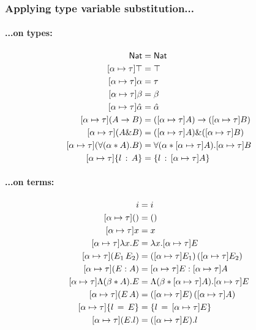 \documentclass{article}
\newcommand{\mypar}[1]{\vspace{0.2cm}\paragraph{#1:} \hfill\vspace{0.1cm}}
\begin{document}
\subsubsection{Applying type variable substitution...}
\begin{minipage}[t]{0.5\textwidth}
  \mypar{{...on types}}
  \begin{align*}
    [{\alpha}\mapsto{\tau}]\nat                  &= \nat\\
    [{\alpha}\mapsto{\tau}]\top                  &= \top\\
    [{\alpha}\mapsto{\tau}]\alpha                &= \tau\\
    [{\alpha}\mapsto{\tau}]\beta                 &= \beta\\
    [{\alpha}\mapsto{\tau}]\hat\alpha            &= \hat\alpha\\
    [{\alpha}\mapsto{\tau}](A\to B)              &= ([\substitution{\alpha}{\tau}]A)\to([\substitution{\alpha}{\tau}]B)\\
    [{\alpha}\mapsto{\tau}](A\& B)               &= ([\substitution{\alpha}{\tau}]A)\&([\substitution{\alpha}{\tau}]B)\\
    [{\alpha}\mapsto{\tau}](\Tabs{\alpha}{A}{B}) &= \Tabs{\alpha}{[\substitution{\alpha}{\tau}]A}{[\substitution{\alpha}{\tau}]B}\\
    [{\alpha}\mapsto{\tau}]\trecord{l}{A}        &= \trecord{l}{[\substitution{\alpha}{\tau}]A}
  \end{align*}
\end{minipage}
\begin{minipage}[t]{0.5\textwidth}
  \mypar{{...on terms}}
  \begin{align*}
    [\substitution{\alpha}{\tau}]i &= i\\
    [\substitution{\alpha}{\tau}]() &= ()\\
    [\substitution{\alpha}{\tau}]x &= x\\
    [\substitution{\alpha}{\tau}]\abs{x}{E} &= \abs{x}{[\substitution{\alpha}{\tau}]E}\\
    [\substitution{\alpha}{\tau}](E_1\,E_2) &= ([\substitution{\alpha}{\tau}]E_1)\,([\substitution{\alpha}{\tau}]E_2)\\
    [\substitution{\alpha}{\tau}](E : A) &= [\substitution{\alpha}{\tau}]E : [\substitution{\alpha}{\tau}]A\\
    [\substitution{\alpha}{\tau}]\tabs{\beta}{A}{E} &= \tabs{\beta}{[\substitution{\alpha}{\tau}]A}{[\substitution{\alpha}{\tau}]E}\\
    [\substitution{\alpha}{\tau}](E\,A) &= ([\substitution{\alpha}{\tau}]E)\, ([\substitution{\alpha}{\tau}]A)\\
    [\substitution{\alpha}{\tau}]\record{l}{E} &= \record{l}{[\substitution{\alpha}{\tau}]E}\\
    [\substitution{\alpha}{\tau}](E.l) &= ([\substitution{\alpha}{\tau}]E).l
  \end{align*}
\end{minipage}\\
\end{document}
